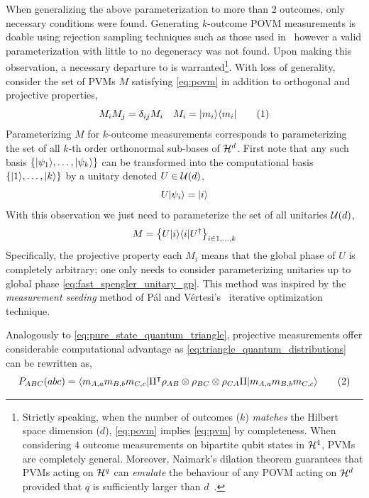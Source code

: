 \documentclass[aps, 10pt, english, twoside, pra, nofootinbib, longbibliography]{revtex4-1}
\begin{document}
    When generalizing the above parameterization to more than $2$ outcomes, only necessary conditions were found. Generating $k$-outcome POVM measurements is doable using rejection sampling techniques such as those used in~\cite{Petz_2012} however a valid parameterization with little to no degeneracy was not found. Upon making this observation, a necessary departure to  is warranted\footnote{Strictly speaking, when the number of outcomes ($k$) \textit{matches} the Hilbert space dimension ($d$), \cref{eq:povm} implies \cref{eq:pvm} by completeness. When considering $4$ outcome measurements on bipartite qubit states in $\mathcal{H}^4$, PVMs are completely general. Moreover, Naimark's dilation theorem guarantees that PVMs acting on $\mathcal{H}^q$ can \textit{emulate} the behaviour of any POVM acting on $\mathcal{H}^d$ provided that $q$ is sufficiently larger than $d$~\cite{Naimark}.}. With loss of generality, consider the set of PVMs $M$ satisfying \cref{eq:povm} in addition to orthogonal and projective properties,
    \[ M_i M_j = \de_{ij} M_i \quad M_i = \ket{m_i}\bra{m_i} \eq \label{eq:pvm}\]
    Parameterizing $M$ for $k$-outcome measurements corresponds to parameterizing the set of all $k$-th order orthonormal sub-bases of $\mathcal{H}^d$.
    First note that any such basis $\bc{\ket{\psi_1}, \ldots, \ket{\psi_k}}$ can be transformed into the computational basis $\bc{\ket{1}, \ldots, \ket{k}}$ by a unitary denoted $U \in \mathcal{U}\br{d}$,
    \[ U \ket{\psi_i} = \ket{i} \]
    With this observation we just need to parameterize the set of all unitaries $\mathcal{U}\br{d}$,
    \[ M = \bc{ U\ket{i}\bra{i}U^\dagger }_{i \in 1, \ldots, k} \]
    Specifically, the projective property each $M_i$ means that the global phase of $U$ is completely arbitrary; one only needs to consider parameterizing unitaries up to global phase \cref{eq:fast_spengler_unitary_gp}. This method was inspired by the \textit{measurement seeding} method of P{\'{a}}l and V{\'{e}}rtesi's~\cite{Pal_2010} iterative optimization technique.

    Analogously to \cref{eq:pure_state_quantum_triangle}, projective measurements offer considerable computational advantage as \cref{eq:triangle_quantum_distributions} can be rewritten as,
    \[ \prob[ABC]\br{abc} = \bramidket{m_{A,a}m_{B,b}m_{C,c}}{\netperm^\intercal \rho_{AB}\otimes\rho_{BC}\otimes\rho_{CA} \netperm}{m_{A,a}m_{B,b}m_{C,c}} \eq \label{eq:pure_meas_quantum_triangle} \]
\end{document}
